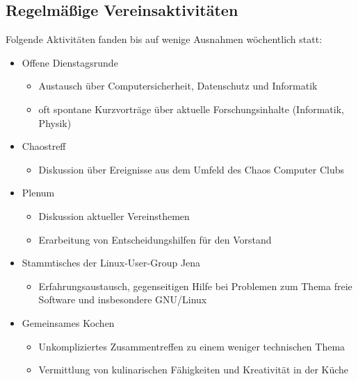 \documentclass[10pt, a4paper]{scrartcl}
\begin{document}
\subsection*{Regelmäßige Vereinsaktivitäten}
Folgende Aktivitäten fanden bis auf wenige Ausnahmen wöchentlich statt:
\begin{itemize}
	\item Offene Dienstagsrunde
		\begin{itemize}
			\item Austausch über Computersicherheit, Datenschutz und Informatik
			\item oft spontane Kurzvorträge über aktuelle Forschungsinhalte (Informatik, Physik)
		\end{itemize}
	\item Chaostreff
		\begin{itemize}
			\item Diskussion über Ereignisse aus dem Umfeld des Chaos Computer Clubs
		\end{itemize}
	\item Plenum
		\begin{itemize}
			\item Diskussion aktueller Vereinsthemen
			\item Erarbeitung von Entscheidungshilfen für den Vorstand
		\end{itemize}
	\item Stammtisches der Linux-User-Group Jena
		\begin{itemize}
			\item Erfahrungsaustausch, gegenseitigen Hilfe bei Problemen zum Thema freie Software und insbesondere GNU/Linux
		\end{itemize}
	\item Gemeinsames Kochen
		\begin{itemize}
			\item Unkompliziertes Zusammentreffen zu einem weniger technischen Thema
			\item Vermittlung von kulinarischen Fähigkeiten und Kreativität in der Küche
		\end{itemize}
\end{itemize}
\end{document}
